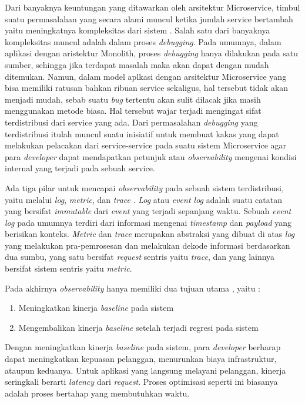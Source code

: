 Dari banyaknya keuntungan yang ditawarkan oleh arsitektur Microservice, timbul suatu permasalahan yang secara alami muncul ketika jumlah service bertambah yaitu meningkatnya kompleksitas dari sistem \citep{fowler-complexity}. Salah satu dari banyaknya kompleksitas muncul adalah dalam proses \textit{debugging}. Pada umumnya, dalam aplikasi dengan aristektur Monolith, proses \textit{debugging} hanya dilakukan pada satu sumber, sehingga jika terdapat masalah maka akan dapat dengan mudah ditemukan. Namun, dalam model aplkasi dengan arsitektur Microservice yang bisa memiliki ratusan bahkan ribuan service sekaligus, hal tersebut tidak akan menjadi mudah, sebab suatu \textit{bug} tertentu akan sulit dilacak jika masih menggunakan metode biasa. Hal tersebut wajar terjadi mengingat sifat terdistribusi dari service yang ada. Dari permasalahan \textit{debugging} yang terdistribusi itulah muncul suatu inisiatif untuk membuat kakas yang dapat melakukan pelacakan dari service-service pada suatu sistem Microservice agar para \textit{developer} dapat mendapatkan petunjuk atau \textit{observability} mengenai kondisi internal yang terjadi pada sebuah service.

Ada tiga pilar untuk mencapai \textit{observability} pada sebuah sistem terdistribusi, yaitu melalui \textit{log}, \textit{metric}, dan \textit{trace} \citep{sridharan2018distributed}. \textit{Log} atau \textit{event log} adalah suatu catatan yang bersifat \textit{immutable} dari \textit{event} yang terjadi sepanjang waktu. Sebuah \textit{event log} pada umumnya terdiri dari informasi mengenai \textit{timestamp} dan \textit{payload} yang berisikan konteks. \textit{Metric} dan \textit{trace} merupakan abstraksi yang dibuat di atas \textit{log} yang melakukan pra-pemrosesan dan melakukan dekode informasi berdasarkan dua sumbu, yang satu bersifat \textit{request} sentris yaitu \textit{trace}, dan yang lainnya bersifat sistem sentris yaitu \textit{metric}.

Pada akhirnya \textit{observability} hanya memiliki dua tujuan utama \citep{parker2020distributed}, yaitu :
\begin{enumerate}
	\item Meningkatkan kinerja  \textit{baseline} pada sistem
	\item Mengembalikan kinerja \textit{baseline} setelah terjadi regresi pada sistem
\end{enumerate}

Dengan meningkatkan kinerja \textit{baseline} pada sistem, para \textit{developer} berharap dapat meningkatkan kepuasan pelanggan, menurunkan biaya infrastruktur, ataupun keduanya. Untuk aplikasi yang langsung melayani pelanggan, kinerja seringkali berarti \textit{latency} dari \textit{request}. Proses optimisasi seperti ini biasanya adalah proses bertahap yang membutuhkan waktu.

